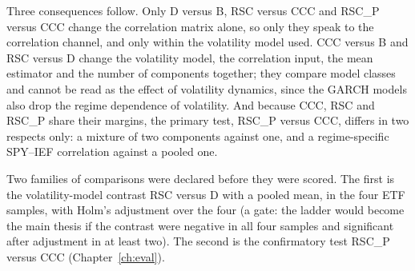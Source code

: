 Three consequences follow. Only D versus B, RSC versus CCC and RSC\_P versus CCC change the correlation matrix alone, so only they speak to the correlation channel, and only within the volatility model used. CCC versus B and RSC versus D change the volatility model, the correlation input, the mean estimator and the number of components together; they compare model classes and cannot be read as the effect of volatility dynamics, since the GARCH models also drop the regime dependence of volatility. And because CCC, RSC and RSC\_P share their margins, the primary test, RSC\_P versus CCC, differs in two respects only: a mixture of two components against one, and a regime-specific SPY--IEF correlation against a pooled one.

Two families of comparisons were declared before they were scored. The first is the volatility-model contrast RSC versus D with a pooled mean, in the four ETF samples, with Holm's adjustment over the four (a gate: the ladder would become the main thesis if the contrast were negative in all four samples and significant after adjustment in at least two). The second is the confirmatory test RSC\_P versus CCC (Chapter~\ref{ch:eval}).
